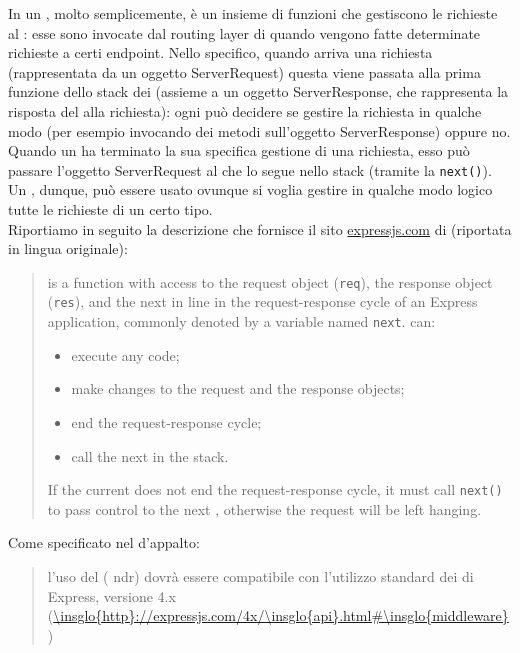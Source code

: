  \label{app:express}
		In  un , molto semplicemente, è un insieme di funzioni che gestiscono le richieste al : esse sono invocate dal routing layer di  quando vengono fatte determinate richieste  a certi endpoint. Nello specifico, quando arriva una richiesta (rappresentata da un oggetto ServerRequest) questa viene passata alla prima funzione dello stack dei  (assieme a un oggetto ServerResponse, che rappresenta la risposta del  alla richiesta): ogni  può decidere se gestire la richiesta in qualche modo (per esempio invocando dei metodi sull'oggetto ServerResponse) oppure no. Quando un  ha terminato la sua specifica gestione di una richiesta, esso può passare l'oggetto ServerRequest al  che lo segue nello stack (tramite la  \texttt{next()}). Un , dunque, può essere usato ovunque si voglia gestire in qualche modo logico tutte le richieste di un certo tipo.\\
		Riportiamo in seguito la descrizione che fornisce il sito \url{expressjs.com} di  (riportata in lingua originale):
		\begin{quote}
			 is a function with access to the request object (\texttt{req}), the response object (\texttt{res}), and the next  in line in the request-response cycle of an Express application, commonly denoted by a variable named \texttt{next}.  can:
			\begin{itemize}
				\item execute any code;
				\item make changes to the request and the response objects;
				\item end the request-response cycle;
				\item call the next  in the stack.
			\end{itemize}
			If the current  does not end the request-response cycle, it must call \texttt{next()} to pass control to the next , otherwise the request will be left hanging.
		\end{quote}
		Come specificato nel  d'appalto:
		\begin{quote}
			l'uso del  ( ndr) dovrà essere compatibile con l’utilizzo standard dei  di Express, versione 4.x (\url{\insglo{http}://expressjs.com/4x/\insglo{api}.html#\insglo{middleware}})
		\end{quote}
